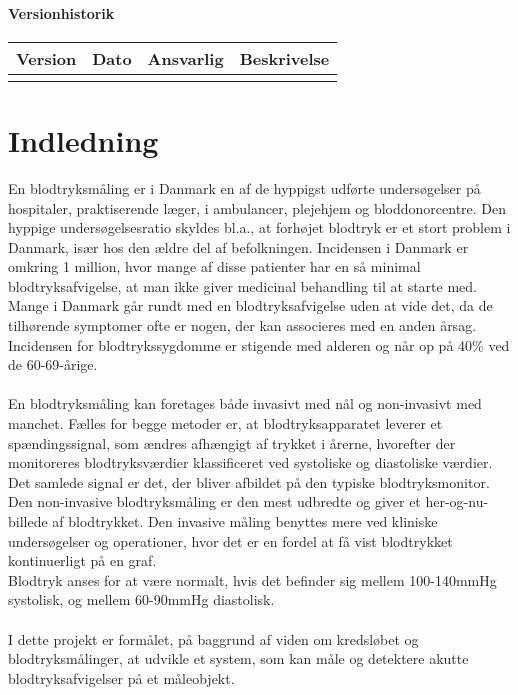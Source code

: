 \subsubsection{Versionhistorik}

\begin{longtabu} to 
    Version &    Dato &    Ansvarlig &    Beskrivelse\\[-1ex]
    \midrule
   
    	
\label{version_Systemark}
\end{longtabu}

\chapter{Indledning}

En blodtryksmåling er i Danmark en af de hyppigst udførte undersøgelser på hospitaler, praktiserende læger, i ambulancer, plejehjem og bloddonorcentre. 
Den hyppige undersøgelsesratio skyldes bl.a., at forhøjet blodtryk er et stort problem i Danmark, især hos den ældre del af befolkningen. Incidensen i Danmark er omkring 1 million, hvor mange af disse patienter har en så minimal blodtryksafvigelse, at man ikke giver medicinal behandling til at starte med. Mange i Danmark går rundt med en blodtryksafvigelse uden at vide det, da de tilhørende symptomer ofte er nogen, der kan associeres med en anden årsag. Incidensen for blodtrykssygdomme er stigende med alderen og når op på 40\% ved de 60-69-årige.\cite{Statistik} \\
\\
En blodtryksmåling kan foretages både invasivt med nål og non-invasivt med manchet. Fælles for begge metoder er, at blodtryksapparatet leverer et spændingssignal, som ændres afhængigt af trykket i årerne, hvorefter der monitoreres blodtryksværdier klassificeret ved systoliske og diastoliske værdier. Det samlede signal er det, der bliver afbildet på den typiske blodtryksmonitor.\\
Den non-invasive blodtryksmåling er den mest udbredte og giver et her-og-nu-billede af blodtrykket. Den invasive måling benyttes mere ved kliniske undersøgelser og operationer, hvor det er en fordel at få vist blodtrykket kontinuerligt på en graf.\\
 Blodtryk anses for at være normalt, hvis det befinder sig mellem 100-140mmHg systolisk, og mellem 60-90mmHg diastolisk.\cite{normalt blodtryk} \\
 \\
I dette projekt er formålet, på baggrund af viden om kredsløbet og blodtryksmålinger, at udvikle et system, som kan måle og detektere akutte blodtryksafvigelser på et måleobjekt.\\ 
